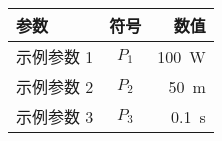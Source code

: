 \documentclass[preview,convert,convert={outext=.png,command=\unexpanded{pdftocairo -r 600 -png \infile}}]{standalone}
\begin{document}
\thispagestyle{empty}
\begin{table}[htbp]
    \centering
    \label{tab:exampletable}
    \begin{tabular}{lcr}
        \toprule
        参数 & 符号 & 数值 \\
        \midrule
        示例参数 1 & $P_1$ & \SI{100}{\watt} \\
        示例参数 2 & $P_2$ & \SI{50}{\meter} \\
        示例参数 3 & $P_3$ & \SI{0.1}{\second} \\
        \bottomrule
    \end{tabular}
\end{table}
\end{document}
